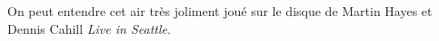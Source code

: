 On peut entendre cet air très joliment joué sur le disque de Martin Hayes et
Dennis Cahill \emph{Live in Seattle}.

\tune
